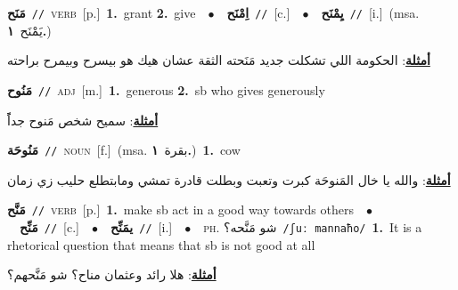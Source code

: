 \documentclass[10pt,a4paper,twoside]{article} %
\begin{document}
\begin{multicols}{2}
{\setlength\topsep{0pt}\textbf{\foreignlanguage{arabic}{مَنَح}}\ {\color{gray}\texttt{//}\color{black}}\ \textsc{verb}\ [p.]\ \textbf{1.}~grant  \textbf{2.}~give\ \ $\bullet$\ \ \setlength\topsep{0pt}\textbf{\foreignlanguage{arabic}{اِمْنَح}}\ {\color{gray}\texttt{//}\color{black}}\ [c.]\ \ $\bullet$\ \ \setlength\topsep{0pt}\textbf{\foreignlanguage{arabic}{يِمْنَح}}\ {\color{gray}\texttt{//}\color{black}}\ [i.]\ \color{gray}(msa. \foreignlanguage{arabic}{يَمْنَح}~\foreignlanguage{arabic}{\textbf{١.}})\color{black}\  \begin{flushright}\color{gray}\foreignlanguage{arabic}{\textbf{\underline{\foreignlanguage{arabic}{أمثلة}}}: الحكومة اللي تشكلت جديد مَنَحته الثقة عشان هيك هو بيسرح وبيمرح براحته}\end{flushright}\color{black}} \vspace{2mm}

{\setlength\topsep{0pt}\textbf{\foreignlanguage{arabic}{مَنُوح}}\ {\color{gray}\texttt{//}\color{black}}\ \textsc{adj}\ [m.]\ \textbf{1.}~generous  \textbf{2.}~sb who gives generously\  \begin{flushright}\color{gray}\foreignlanguage{arabic}{\textbf{\underline{\foreignlanguage{arabic}{أمثلة}}}: سميح شخص مَنوح جداًً}\end{flushright}\color{black}} \vspace{2mm}

{\setlength\topsep{0pt}\textbf{\foreignlanguage{arabic}{مَنُوحَة}}\ {\color{gray}\texttt{//}\color{black}}\ \textsc{noun}\ [f.]\ \color{gray}(msa. \foreignlanguage{arabic}{بقرة}~\foreignlanguage{arabic}{\textbf{١.}})\color{black}\ \textbf{1.}~cow\  \begin{flushright}\color{gray}\foreignlanguage{arabic}{\textbf{\underline{\foreignlanguage{arabic}{أمثلة}}}: والله يا خال المَنوحَة كبرت وتعبت وبطلت قادرة تمشي ومابتطلع حليب زي زمان}\end{flushright}\color{black}} \vspace{2mm}

{\setlength\topsep{0pt}\textbf{\foreignlanguage{arabic}{مَنَّح}}\ {\color{gray}\texttt{//}\color{black}}\ \textsc{verb}\ [p.]\ \textbf{1.}~make sb act in a good way towards others\ \ $\bullet$\ \ \setlength\topsep{0pt}\textbf{\foreignlanguage{arabic}{مَنِّح}}\ {\color{gray}\texttt{//}\color{black}}\ [c.]\ \ $\bullet$\ \ \setlength\topsep{0pt}\textbf{\foreignlanguage{arabic}{يمَنِّح}}\ {\color{gray}\texttt{//}\color{black}}\ [i.]\ \ $\bullet$\ \ \textsc{ph.} \color{gray} \foreignlanguage{arabic}{شو مَنَّحه؟}\color{black}\ {\color{gray}\texttt{/{\sffamily ʃuː mannaħo}/}\color{black}}\ \textbf{1.}~It is a rhetorical question that means that sb is not good at all\  \begin{flushright}\color{gray}\foreignlanguage{arabic}{\textbf{\underline{\foreignlanguage{arabic}{أمثلة}}}: هلا رائد وعثمان مناح؟ شو مَنَّحهم؟}\end{flushright}\color{black}} \vspace{2mm}


\end{multicols}
\end{document}
